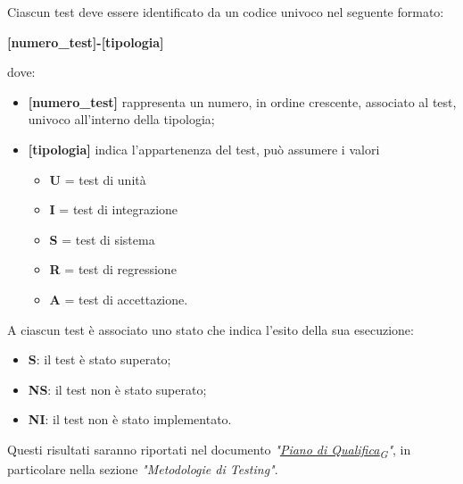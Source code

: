 Ciascun test deve essere identificato da un codice univoco nel seguente formato:
\begin{center}
	\textbf{[numero\_test]-[tipologia]}
\end{center}
dove:
\begin{itemize}
	\item \textbf{[numero\_test]} rappresenta un numero, in ordine crescente, associato al test, univoco all'interno della tipologia;
	\item \textbf{[tipologia]} indica l'appartenenza del test, può assumere i valori
	      \begin{itemize}
		      \item \textbf{U} = test di unità
		      \item \textbf{I} = test di integrazione
		      \item \textbf{S} = test di sistema
		      \item \textbf{R} = test di regressione
		      \item \textbf{A} = test di accettazione.
	      \end{itemize}

\end{itemize}

A ciascun test è associato uno stato che indica l'esito della sua esecuzione:
\begin{itemize}
	\item \textbf{S}: il test è stato superato;
	\item \textbf{NS}: il test non è stato superato;
	\item \textbf{NI}: il test non è stato implementato.
\end{itemize}
Questi risultati saranno riportati nel documento \textit{"\href{https://7last.github.io/docs/pb/documentazione-interna/glossario\#piano-di-qualifica}{Piano di Qualifica\textsubscript{G}}"}, in particolare nella sezione \textit{"Metodologie di Testing"}.

